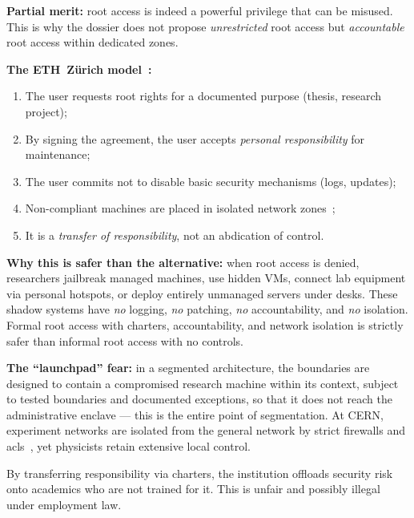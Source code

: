 \begin{answerbox}[Answer to Q3.1]
\textbf{Partial merit:} root access is indeed a powerful privilege that can be misused. This is why the dossier does not propose \emph{unrestricted} root access but \emph{accountable} root access within dedicated zones.

\medskip\noindent\textbf{The ETH~Z\"urich model~\cite{eth-admin-agreement}:}
\begin{enumerate}[nosep]
    \item The user requests root rights for a documented purpose (thesis, research project);
    \item By signing the agreement, the user accepts \emph{personal responsibility} for maintenance;
    \item The user commits not to disable basic security mechanisms (logs, updates);
    \item Non-compliant machines are placed in isolated network zones~\cite{eth-baseline};
    \item It is a \emph{transfer of responsibility}, not an abdication of control.
\end{enumerate}

\noindent\textbf{Why this is safer than the alternative:} when root access is denied, researchers jailbreak managed machines, use hidden VMs, connect lab equipment via personal hotspots, or deploy entirely unmanaged servers under desks. These shadow systems have \emph{no} logging, \emph{no} patching, \emph{no} accountability, and \emph{no} isolation. Formal root access with charters, accountability, and network isolation is strictly safer than informal root access with no controls.

\medskip\noindent\textbf{The ``launchpad'' fear:} in a segmented architecture, the boundaries are designed to contain a compromised research machine within its context, subject to tested boundaries and documented exceptions, so that it does not reach the administrative enclave --- this is the entire point of segmentation. At CERN, experiment networks are isolated from the general network by strict firewalls and \gls{acl}s~\cite{cern-tn}, yet physicists retain extensive local control.
\end{answerbox}

\bigskip

\begin{questionbox}[Q3.2 --- ``Researcher autonomy = researcher liability --- this unfairly burdens academics'']
By transferring responsibility via charters, the institution offloads security risk onto academics who are not trained for it. This is unfair and possibly illegal under employment law.
\end{questionbox}


